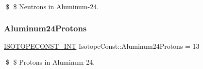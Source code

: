 \$ \$ Neutrons in Aluminum-\/24. \mbox{\label{group___isotope_const-_aluminum-_al24_gac3582db5a6b7a5608ee611e9affee90b}} 
\subsubsection{\texorpdfstring{Aluminum24\+Protons}{Aluminum24Protons}}
{\footnotesize\ttfamily \mbox{\hyperlink{group___isotope_const-_macros_ga5f18360b3e99483a35c32d789e62621c}{I\+S\+O\+T\+O\+P\+E\+C\+O\+N\+S\+T\+\_\+\+I\+NT}} Isotope\+Const\+::\+Aluminum24\+Protons = 13}

\$ \$ Protons in Aluminum-\/24. 